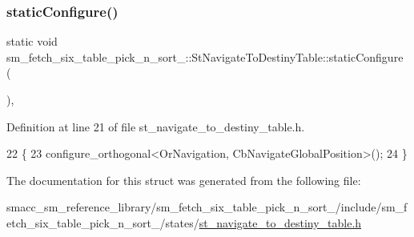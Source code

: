 \subsubsection{\texorpdfstring{static\+Configure()}{staticConfigure()}}
{\footnotesize\ttfamily static void sm\+\_\+fetch\+\_\+six\+\_\+table\+\_\+pick\+\_\+n\+\_\+sort\+\_\+::\+St\+Navigate\+To\+Destiny\+Table\+::static\+Configure (\begin{DoxyParamCaption}{ }\end{DoxyParamCaption})\hspace{0.3cm}{\ttfamily [inline]}, {\ttfamily [static]}}



Definition at line 21 of file st\+\_\+navigate\+\_\+to\+\_\+destiny\+\_\+table.\+h.


\begin{DoxyCode}
22         \{
23             configure\_orthogonal<OrNavigation, CbNavigateGlobalPosition>();
24         \}
\end{DoxyCode}


The documentation for this struct was generated from the following file\+:\begin{DoxyCompactItemize}
\item 
smacc\+\_\+sm\+\_\+reference\+\_\+library/sm\+\_\+fetch\+\_\+six\+\_\+table\+\_\+pick\+\_\+n\+\_\+sort\+\_/include/sm\+\_\+fetch\+\_\+six\+\_\+table\+\_\+pick\+\_\+n\+\_\+sort\+\_/states/\hyperlink{st__navigate__to__destiny__table_8h}{st\+\_\+navigate\+\_\+to\+\_\+destiny\+\_\+table.\+h}\end{DoxyCompactItemize}
